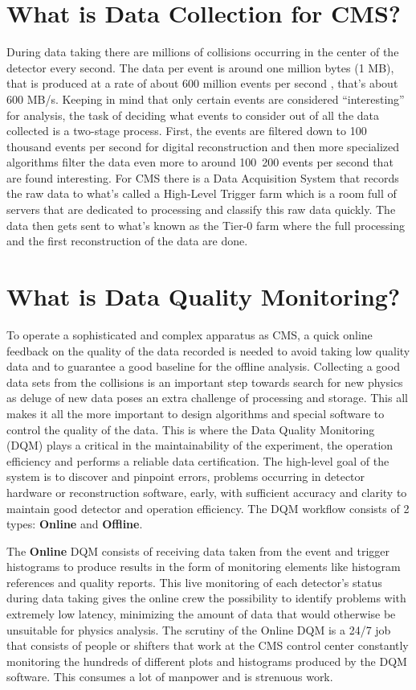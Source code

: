 \section{What is Data Collection for CMS?}

During data taking there are millions of collisions occurring in the center of the detector every second. The data per event is around one million bytes (1 MB), that is produced at a rate of about 
600 million events per second \cite{datataking}, that’s about 600 MB/s. Keeping in mind that only certain events are considered “interesting” for analysis, the task of deciding what events to consider out of all the data collected is a two-stage process. 
First, the events are filtered down to 100 thousand events per second for digital reconstruction and then more specialized algorithms filter the data even more to around 100~200 events per second that are found interesting.
For CMS there is a Data Acquisition System that records the raw data to what’s called a High-Level Trigger farm which is a room full of servers that are dedicated to processing and classify this raw data quickly. 
The data then gets sent to what’s known as the Tier-0 farm where the full processing and the first reconstruction of the data are done. \cite{cmscomputing} 


\section{What is Data Quality Monitoring?}
To operate a sophisticated and complex apparatus as CMS, a quick online feedback on the quality of the data recorded is needed to avoid taking low quality data and to guarantee a good baseline for the offline analysis. Collecting a good data sets from the collisions is an important step towards search for new physics as deluge of new data poses an extra challenge of processing and storage. This all makes it all the more important to design algorithms and special software to control the quality of the data. This is where the Data Quality Monitoring (DQM) plays a critical in the maintainability of the experiment, the operation efficiency and performs a reliable data certification.  The high-level goal of the system is to discover and pinpoint errors, problems occurring in detector hardware or reconstruction software, early, with sufficient accuracy and clarity to maintain good detector and operation efficiency. The DQM workflow consists of 2 types: \textbf{Online}  and \textbf{Offline}.

The \textbf{Online} DQM consists of receiving data taken from the event and trigger histograms to produce results in the form of monitoring elements like histogram references and quality reports. This live monitoring of each detector’s status during data taking gives the online crew the possibility to identify problems with extremely low latency, minimizing the amount of data that would otherwise be unsuitable for physics analysis. The scrutiny of the Online DQM is a 24/7 job that consists of people or shifters that work at the CMS control center constantly monitoring the hundreds of different plots and histograms produced by the DQM software. This consumes a lot of manpower and is strenuous work.



